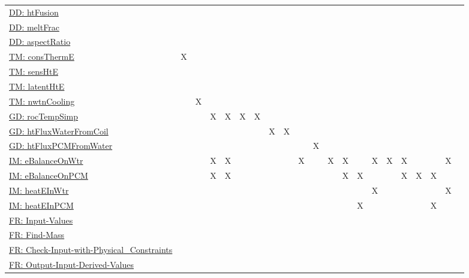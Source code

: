 \documentclass[12pt]{article}
\begin{document}
\begin{longtable}{l l l l l l l l l l l l l l l l l l l l l}
\hyperref[DD:htFusion]{DD: htFusion} &  &  &  &  &  &  &  &  &  &  &  &  &  &  &  &  &  &  &  & 
\\
\hyperref[DD:meltFrac]{DD: meltFrac} &  &  &  &  &  &  &  &  &  &  &  &  &  &  &  &  &  &  &  & 
\\
\hyperref[DD:aspectRatio]{DD: aspectRatio} &  &  &  &  &  &  &  &  &  &  &  &  &  &  &  &  &  &  &  & 
\\
\hyperref[TM:consThermE]{TM: consThermE} & X &  &  &  &  &  &  &  &  &  &  &  &  &  &  &  &  &  &  & 
\\
\hyperref[TM:sensHtE]{TM: sensHtE} &  &  &  &  &  &  &  &  &  &  &  &  &  &  &  &  &  &  &  & 
\\
\hyperref[TM:latentHtE]{TM: latentHtE} &  &  &  &  &  &  &  &  &  &  &  &  &  &  &  &  &  &  &  & 
\\
\hyperref[TM:nwtnCooling]{TM: nwtnCooling} &  & X &  &  &  &  &  &  &  &  &  &  &  &  &  &  &  &  &  & 
\\
\hyperref[GD:rocTempSimp]{GD: rocTempSimp} &  &  & X & X & X & X &  &  &  &  &  &  &  &  &  &  &  &  &  & 
\\
\hyperref[GD:htFluxWaterFromCoil]{GD: htFluxWaterFromCoil} &  &  &  &  &  &  & X & X &  &  &  &  &  &  &  &  &  &  &  & 
\\
\hyperref[GD:htFluxPCMFromWater]{GD: htFluxPCMFromWater} &  &  &  &  &  &  &  &  &  & X &  &  &  &  &  &  &  &  &  & 
\\
\hyperref[IM:eBalanceOnWtr]{IM: eBalanceOnWtr} &  &  & X & X &  &  &  &  & X &  & X & X &  & X & X & X &  &  & X & 
\\
\hyperref[IM:eBalanceOnPCM]{IM: eBalanceOnPCM} &  &  & X & X &  &  &  &  &  &  &  & X & X &  &  & X & X & X &  & 
\\
\hyperref[IM:heatEInWtr]{IM: heatEInWtr} &  &  &  &  &  &  &  &  &  &  &  &  &  & X &  &  &  &  & X & 
\\
\hyperref[IM:heatEInPCM]{IM: heatEInPCM} &  &  &  &  &  &  &  &  &  &  &  &  & X &  &  &  &  & X &  & 
\\
\hyperref[inputValues]{FR: Input-Values} &  &  &  &  &  &  &  &  &  &  &  &  &  &  &  &  &  &  &  & 
\\
\hyperref[findMass]{FR: Find-Mass} &  &  &  &  &  &  &  &  &  &  &  &  &  &  &  &  &  &  &  & 
\\
\hyperref[checkWithPhysConsts]{FR: Check-Input-with-Physical\_Constraints} &  &  &  &  &  &  &  &  &  &  &  &  &  &  &  &  &  &  &  & 
\\
\hyperref[outputInputDerivVals]{FR: Output-Input-Derived-Values} &  &  &  &  &  &  &  &  &  &  &  &  &  &  &  &  &  &  &  & 

\end{longtable}
\end{document}
